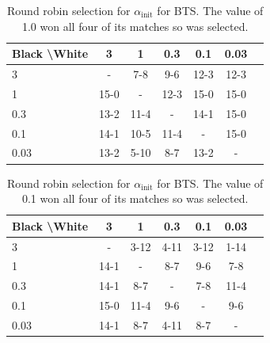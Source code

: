     \begin{table}[tbp]
    \centering
        \begin{tabular}{l|cccccc}
            \textbf{Black \textbackslash White}     & 3  & 1   & 0.3   & 0.1    & 0.03    \\ 
            \hline
                                    3            & -     	& 7-8  		& 9-6  		&  12-3 		& 12-3  		\\
                                    1            & 15-0 & - & 12-3 & 15-0 & 15-0   		\\
                                    0.3          & 13-2 & 11-4 & - & 14-1 & 15-0  		\\
                                    0.1          & 14-1 & 10-5 & 11-4 & - & 15-0   		\\
                                    0.03         & 13-2 & 5-10 & 8-7 & 13-2 &   -   	\\    
        \end{tabular}
        \caption[Round robin  selection for $\alpha_{\text{init}}$ for BTS.]{Round robin  selection for $\alpha_{\text{init}}$ for BTS. The value of 1.0 won all four of its matches so was selected. \label{tab:w001}}
    \end{table}
    
    \begin{table}[tbp]
    \centering
        \begin{tabular}{l|cccccc}
            \textbf{Black \textbackslash White}     & 3  & 1   & 0.3   & 0.1    & 0.03    \\ 
            \hline
                                    3            & -     & 3-12  & 4-11  & 3-12  & 1-14  \\
                                    1             & 14-1  & -     & 8-7  & 9-6  & 7-8  \\
                                    0.3             & 14-1   & 8-7   &   -   & 7-8  & 11-4  \\
                                    0.1              & 15-0  & 11-4  & 9-6  & -     & 9-6  \\
                                    0.03              & 14-1  & 8-7  & 4-11  & 8-7  &   -   \\    
        \end{tabular}
        \caption[Round robin  selection for $\alpha_{\text{init}}$ for BTS.]{Round robin  selection for $\alpha_{\text{init}}$ for BTS. The value of 0.1 won all four of its matches so was selected. \label{tab:x001}}
    \end{table}
    
